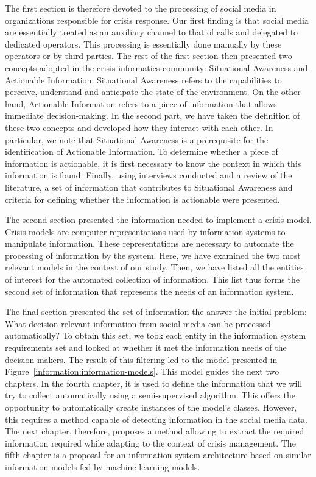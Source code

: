 The first section is therefore devoted to the processing of social media in organizations responsible for crisis response.
Our first finding is that social media are essentially treated as an auxiliary channel to that of calls and delegated to dedicated operators.
This processing is essentially done manually by these operators or by third parties.
The rest of the first section then presented two concepts adopted in the crisis informatics community: Situational Awareness and Actionable Information.
Situational Awareness refers to the capabilities to perceive, understand and anticipate the state of the environment.
On the other hand, Actionable Information refers to a piece of information that allows immediate decision-making.
In the second part, we have taken the definition of these two concepts and developed how they interact with each other.
In particular, we note that Situational Awareness is a prerequisite for the identification of Actionable Information.
To determine whether a piece of information is actionable, it is first necessary to know the context in which this information is found.
Finally, using interviews conducted and a review of the literature, a set of information that contributes to Situational Awareness and criteria for defining whether the information is actionable were presented.

The second section presented the information needed to implement a crisis model.
Crisis models are computer representations used by information systems to manipulate information.
These representations are necessary to automate the processing of information by the system.
Here, we have examined the two most relevant models in the context of our study.
Then, we have listed all the entities of interest for the automated collection of information.
This list thus forms the second set of information that represents the needs of an information system.

The final section presented the set of information the answer the initial problem: What decision-relevant information from social media can be processed automatically?
To obtain this set, we took each entity in the information system requirements set and looked at whether it met the information needs of the decision-makers.
The result of this filtering led to the model presented in Figure~\ref{information:information-models}.
This model guides the next two chapters.
In the fourth chapter, it is used to define the information that we will try to collect automatically using a semi-supervised algorithm.
This offers the opportunity to automatically create instances of the model's classes.
However, this requires a method capable of detecting information in the social media data.
The next chapter, therefore, proposes a method allowing to extract the required information required while adapting to the context of crisis management.
The fifth chapter is a proposal for an information system architecture based on similar information models fed by machine learning models.

